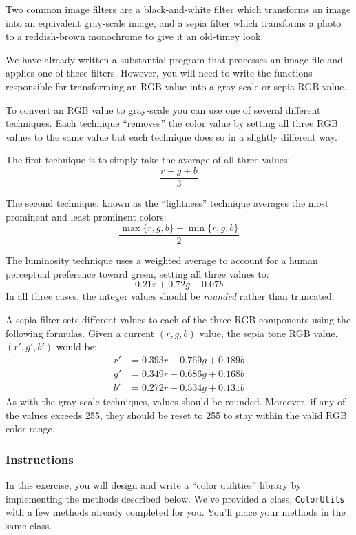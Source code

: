 \documentclass[12pt]{scrartcl}
\begin{document}
Two common image filters are a black-and-white filter which transforms
an image into an equivalent gray-scale image, and a sepia filter which
transforms a photo to a reddish-brown monochrome to give it an old-timey
look.

We have already written a substantial program that processes an image
file and applies one of these filters.  However, you will need to write
the functions responsible for transforming an RGB value into a gray-scale
or sepia RGB value.  

To convert an RGB value to gray-scale you can use one of several
different techniques.  Each technique ``removes'' the color value by
setting all three RGB values to the same value but each technique 
does so in a slightly different way.

The first technique is to simply take the average of all three values:
  $$\frac{r + g + b}{3}$$

The second technique, known as the ``lightness'' technique averages 
the most prominent and least prominent colors:
  $$\frac{\max\{r, g, b\} + \min\{r, g, b\}}{2}$$

The luminosity technique uses a weighted average to account for a human 
perceptual preference toward green, setting all three values to:
  $$0.21 r + 0.72 g + 0.07 b$$
In all three cases, the integer values should be \emph{rounded} rather 
than truncated.

A sepia filter sets different values to each of the three RGB components 
using the following formulas.  Given a current $(r,g,b)$ value, the sepia
tone RGB value, $(r',g',b')$ would be:
$$\begin{array}{ll}
  r' &= 0.393r + 0.769g + 0.189b \\
  g' &= 0.349r + 0.686g + 0.168b \\
  b' &= 0.272r + 0.534g + 0.131b
\end{array}$$
As with the gray-scale techniques, values should be rounded.  Moreover, if
any of the values exceeds 255, they should be reset to 255 to stay within
the valid RGB color range.

\subsubsection*{Instructions}

In this exercise, you will design and write a ``color utilities'' 
library by implementing the methods described below.  We've provided 
a class, \texttt{ColorUtils} with a few methods already
completed for you.  You'll place your methods in the same class.
\end{document}

